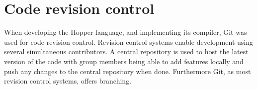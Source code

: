 \section{Code revision control}




When developing the Hopper language, and implementing its compiler, Git\cite{git} was used for code revision control.
Revision control systems enable development using several simultaneous contributors.
A central repository is used to host the latest version of the code with group members
being able to add features locally and push any changes to the central repository when done.  
Furthermore Git, as most revision control systems, offers branching.


